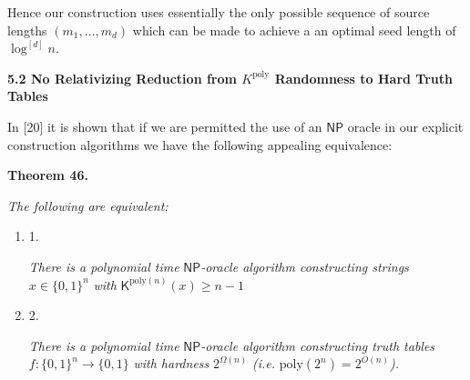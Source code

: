 


Hence our construction uses essentially the only possible sequence of source lengths $(m_{1},\ldots,m_{d})$ which can be made to achieve a an optimal seed length of $\log^{[d]}n$.\par






\par\medskip\noindent\textbf{
5.2 No Relativizing Reduction from $K^{\mathrm{poly}}$ Randomness to Hard Truth Tables}\par




In [20] it is shown that if we are permitted the use of an ${\mathsf{NP}}$ oracle in our explicit construction algorithms we have the following appealing equivalence:\par





\par\medskip\noindent\textbf{
\textbf{Theorem 46}\textbf{.}
}\par



\emph{The following are equivalent:}\par


\begin{enumerate}


\item[] 
1. 


\emph{There is a polynomial time }${\mathsf{NP}}$\emph{-oracle algorithm constructing strings }$x\in\{0,1\}^{n}$\emph{ with }${\mathsf{K}}^{\mathrm{poly}(n)}(x)\geq n-1$\emph{}\par





\item[] 
2. 


\emph{There is a polynomial time }${\mathsf{NP}}$\emph{-oracle algorithm constructing truth tables }$f:\{0,1\}^{n}\to\{0,1\}$\emph{ with hardness }$2^{\Omega(n)}$\emph{ (i.e. }$\mathrm{poly}(2^{n})=2^{O(n)}$\emph{).}\par





\end{enumerate}



